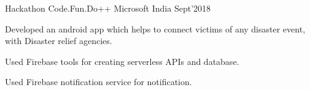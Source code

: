 
\begin{cventries}
  \cventry
  {Hackathon}
  {Code.Fun.Do++}
  {Microsoft India}
  {Sept'2018}
  {
    \begin{cvitems}
    \item Developed an android app which helps to connect victims of any disaster event, with Disaster relief agencies.
    \item Used Firebase tools for creating serverless APIs and database.
    \item Used Firebase notification service for notification.
    \end{cvitems}
  }

\end{cventries}

